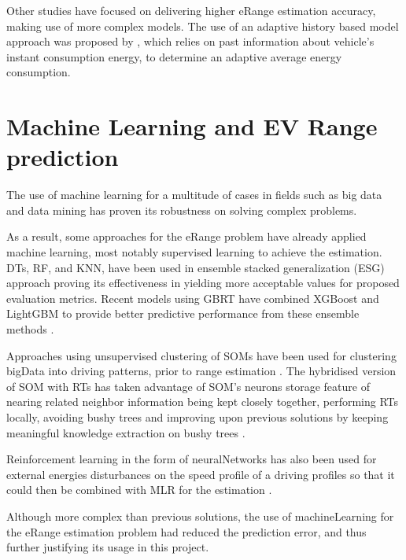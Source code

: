 Other studies have focused on delivering 
higher \gls{eRange} estimation accuracy,
making use of more complex models. 
The use of an adaptive history based model 
approach was proposed by \cite{classicEVX},
which relies on past information about
vehicle's instant consumption energy, to determine an
adaptive average energy consumption.

\section{Machine Learning and EV Range prediction}
\label{sec:stateOfArtML}

The use of machine learning for a multitude
of cases \citep{machineLearningCaseStudy} in fields such as 
big data \citep{machineLearningBigData, machineLearningBigData2}
and data mining \citep{businessDataMining} has 
proven its robustness on solving complex problems.


As a result, some approaches for the \gls{eRange}
problem have already applied machine learning,
most notably supervised learning to achieve the estimation.
\Glspl{DT}, \gls{RF}, and \gls{KNN}, have been 
used in ensemble stacked generalization (ESG) approach 
\citep{eRangeMachineLearningEnsemble} proving its 
effectiveness in yielding more acceptable values
for proposed evaluation metrics.
Recent models using \gls{GBRT} have
combined \gls{XGBoost} and \gls{LightGBM} 
to provide better predictive performance
from these ensemble methods 
\citep{machineLearningERangeGradientBoostRts}.

Approaches using unsupervised clustering 
of \glspl{SOM} have been used for clustering \gls{bigData} 
into driving patterns, prior to range estimation 
\citep{eRangeMachineLearningGHSOM}.
The hybridised version of \gls{SOM} with \glspl{RT} 
has taken advantage of \gls{SOM}'s neurons storage 
feature of nearing related neighbor information
being kept closely together, performing \glspl{RT}
locally, avoiding bushy trees and improving
upon previous solutions by keeping meaningful
knowledge extraction on bushy trees
\citep{machineLearningERangeSOMandRts}.

Reinforcement learning in the form of \gls{neuralNetworks}
has also been used for external energies 
disturbances on the speed profile of a driving profiles 
so that it could then be combined with \gls{MLR} 
for the estimation \citep{eRangeMachineLearningNeuralnetworkMLR}.

Although more complex than previous solutions, 
the use of \gls{machineLearning} for the 
\gls{eRange} estimation problem had reduced 
the prediction error, and thus further justifying
its usage in this project.  


